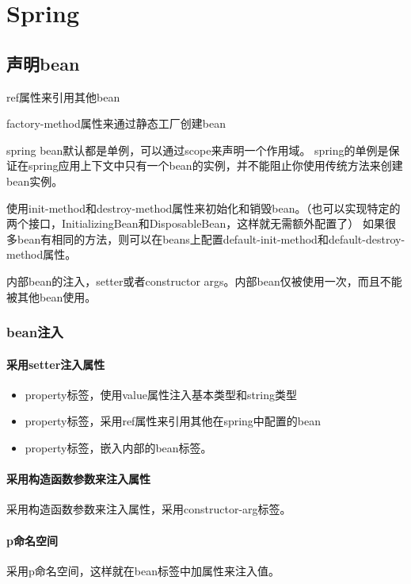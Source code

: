 \chapter{Spring}

\section{声明bean}


ref属性来引用其他bean

factory-method属性来通过静态工厂创建bean

spring bean默认都是单例，可以通过scope来声明一个作用域。 spring的单例是保证在spring应用上下文中只有一个bean的实例，并不能阻止你使用传统方法来创建bean实例。

使用init-method和destroy-method属性来初始化和销毁bean。（也可以实现特定的两个接口，InitializingBean和DisposableBean，这样就无需额外配置了）
如果很多bean有相同的方法，则可以在beans上配置default-init-method和default-destroy-method属性。

内部bean的注入，setter或者constructor args。内部bean仅被使用一次，而且不能被其他bean使用。


\subsection{bean注入}

\subsubsection{采用setter注入属性}
\begin{itemize}
\item property标签，使用value属性注入基本类型和string类型
\item property标签，采用ref属性来引用其他在spring中配置的bean
\item property标签，嵌入内部的bean标签。
\end{itemize}

\subsubsection{采用构造函数参数来注入属性}
采用构造函数参数来注入属性，采用constructor-arg标签。


\subsubsection{p命名空间}

采用p命名空间，这样就在bean标签中加属性来注入值。


